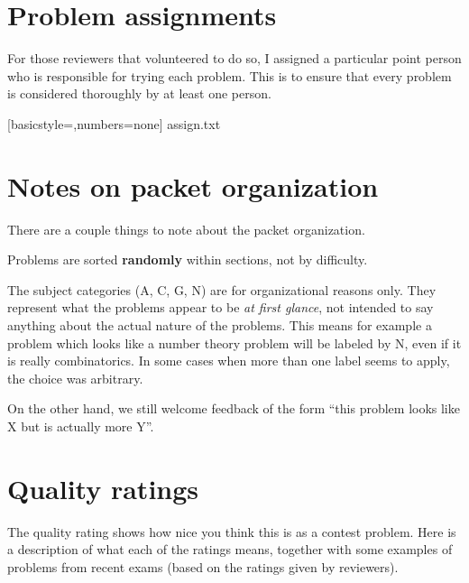 \section{Problem assignments}
For those reviewers that volunteered to do so,
I assigned a particular point person who is responsible
for trying each problem.
This is to ensure that every problem is
considered thoroughly by at least one person.

%
[basicstyle=\ttfamily,numbers=none]
{assign.txt}


\newpage

\section{Notes on packet organization}
There are a couple things to note about the packet organization.
\begin{itemize}
  \ii Problems are sorted \textbf{randomly}
  within sections, not by difficulty.

  \ii The subject categories (A, C, G, N)
  are for organizational reasons only.
  They represent what the problems appear
  to be \emph{at first glance},
  not intended to say anything about the
  actual nature of the problems.
  This means for example a problem which looks
  like a number theory problem will be labeled by N,
  even if it is really combinatorics.
  In some cases when more than one label seems to apply,
  the choice was arbitrary.

  On the other hand, we still welcome feedback of the form
  ``this problem looks like X but is actually more Y''.
\end{itemize}

\section{Quality ratings}
The quality rating shows how nice you think this is as a contest problem.
Here is a description of what each of the ratings means,
together with some examples of problems from recent exams
(based on the ratings given by reviewers).

